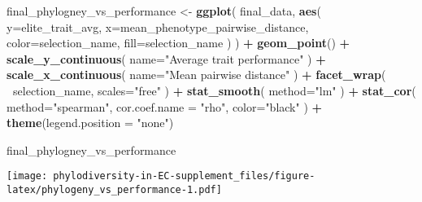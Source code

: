 \documentclass[]{book}
\newenvironment{Shaded}{\begin{snugshade}}{\end{snugshade}}
\newcommand{\DataTypeTok}[1]{\textcolor[rgb]{0.13,0.29,0.53}{#1}}
\newcommand{\KeywordTok}[1]{\textcolor[rgb]{0.13,0.29,0.53}{\textbf{#1}}}
\newcommand{\NormalTok}[1]{#1}
\newcommand{\OperatorTok}[1]{\textcolor[rgb]{0.81,0.36,0.00}{\textbf{#1}}}
\newcommand{\StringTok}[1]{\textcolor[rgb]{0.31,0.60,0.02}{#1}}
\begin{document}
\begin{Shaded}
\begin{Highlighting}[]
\NormalTok{final_phylogney_vs_performance <-}\StringTok{ }\KeywordTok{ggplot}\NormalTok{(}
\NormalTok{    final_data,}
    \KeywordTok{aes}\NormalTok{(}
        \DataTypeTok{y=}\NormalTok{elite_trait_avg,}
        \DataTypeTok{x=}\NormalTok{mean_phenotype_pairwise_distance,}
        \DataTypeTok{color=}\NormalTok{selection_name,}
        \DataTypeTok{fill=}\NormalTok{selection_name}
\NormalTok{    )}
\NormalTok{  ) }\OperatorTok{+}
\StringTok{  }\KeywordTok{geom_point}\NormalTok{() }\OperatorTok{+}
\StringTok{    }\KeywordTok{scale_y_continuous}\NormalTok{(}
        \DataTypeTok{name=}\StringTok{"Average trait performance"}
\NormalTok{  ) }\OperatorTok{+}
\StringTok{  }\KeywordTok{scale_x_continuous}\NormalTok{(}
        \DataTypeTok{name=}\StringTok{"Mean pairwise distance"}
\NormalTok{  ) }\OperatorTok{+}\StringTok{ }
\StringTok{  }\KeywordTok{facet_wrap}\NormalTok{(}
      \OperatorTok{~}\NormalTok{selection_name, }\DataTypeTok{scales=}\StringTok{"free"}
\NormalTok{  ) }\OperatorTok{+}\StringTok{ }
\StringTok{  }\KeywordTok{stat_smooth}\NormalTok{(}
    \DataTypeTok{method=}\StringTok{"lm"}
\NormalTok{  ) }\OperatorTok{+}\StringTok{ }
\StringTok{  }\KeywordTok{stat_cor}\NormalTok{(}
    \DataTypeTok{method=}\StringTok{"spearman"}\NormalTok{, }\DataTypeTok{cor.coef.name =} \StringTok{"rho"}\NormalTok{, }\DataTypeTok{color=}\StringTok{"black"}
\NormalTok{  ) }\OperatorTok{+}
\StringTok{  }\KeywordTok{theme}\NormalTok{(}\DataTypeTok{legend.position =} \StringTok{"none"}\NormalTok{)}
  
\NormalTok{final_phylogney_vs_performance}
\end{Highlighting}
\end{Shaded}

\texttt{[image: phylodiversity-in-EC-supplement\_files/figure-latex/phylogeny\_vs\_performance-1.pdf]}
\end{document}
